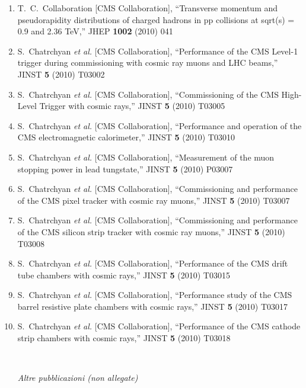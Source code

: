 \documentclass[10pt]{letter}
\begin{document}
\begin{enumerate}
\item T.~C.~Collaboration  [CMS Collaboration],
  ``Transverse momentum and pseudorapidity distributions of charged hadrons in pp collisions at sqrt(s) = 0.9 and 2.36 TeV,''
  JHEP {\bf 1002} (2010) 041
\item S.~Chatrchyan {\it et al.}  [CMS Collaboration],
  ``Performance of the CMS Level-1 trigger during commissioning with cosmic ray muons and LHC beams,''
  JINST {\bf 5} (2010) T03002
\item S.~Chatrchyan {\it et al.}  [CMS Collaboration],
  ``Commissioning of the CMS High-Level Trigger with cosmic rays,''
  JINST {\bf 5} (2010) T03005
\item S.~Chatrchyan {\it et al.}  [CMS Collaboration],
  ``Performance and operation of the CMS electromagnetic calorimeter,''
  JINST {\bf 5} (2010) T03010
\item S.~Chatrchyan {\it et al.}  [CMS Collaboration],
  ``Measurement of the muon stopping power in lead tungstate,''
  JINST {\bf 5} (2010) P03007
\item S.~Chatrchyan {\it et al.}  [CMS Collaboration],
  ``Commissioning and performance of the CMS pixel tracker with cosmic ray muons,''
  JINST {\bf 5} (2010) T03007
\item S.~Chatrchyan {\it et al.}  [CMS Collaboration],
  ``Commissioning and performance of the CMS silicon strip tracker with cosmic ray muons,''
  JINST {\bf 5} (2010) T03008
\item S.~Chatrchyan {\it et al.}  [CMS Collaboration],
  ``Performance of the CMS drift tube chambers with cosmic rays,''
  JINST {\bf 5} (2010) T03015
\item S.~Chatrchyan {\it et al.}  [CMS Collaboration],
  ``Performance study of the CMS barrel resistive plate chambers with cosmic rays,''
  JINST {\bf 5} (2010) T03017
\item S.~Chatrchyan {\it et al.}  [CMS Collaboration],
  ``Performance of the CMS cathode strip chambers with cosmic rays,''
  JINST {\bf 5} (2010) T03018


~\\
\begin{center} \textit{Altre pubblicazioni (non allegate)} \\ \end{center}


\end{enumerate}
\end{document}
